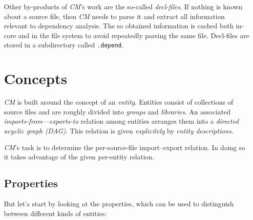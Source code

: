 Other by-products of {\em CM}\/'s work are the so-called {\em decl-files}.
If nothing is known about a source file, then {\em CM} needs to parse it
and extract all information relevant to dependency analysis.  The so
obtained information is cached both in-core and in the file system to avoid
repeatedly parsing the same file.  Decl-files are stored in a subdirectory
called {\tt .depend}.

\section{Concepts}

{\em CM} is built around the concept of an {\em entity}.  Entities consist
of collections of source files and are roughly divided into {\em groups}
and {\em libraries}.  An associated {\em imports-from}---{\em exports-to}
relation among entities arranges them into a {\em directed acyclic graph
(DAG)}.  This relation is given {\em explicitely} by {\em entity
descriptions}.

{\em CM}\/'s task is to determine the per-source-file import--export
relation. In doing so it takes advantage of the given per-entity relation.

\subsection{Properties}

But let's start by looking at the properties, which can be used to
distinguish between different kinds of entities:

